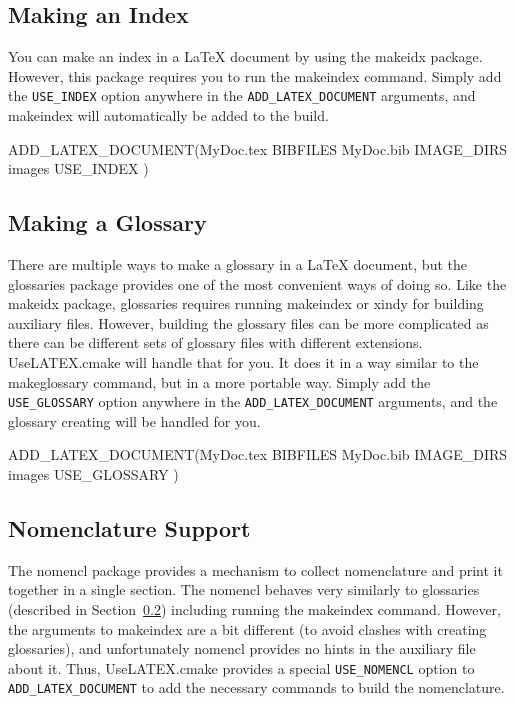 \documentclass{article}
\newcommand*{\textfile}[1]{\textsf{#1}}
\newcommand*{\textprog}[1]{\textfile{#1}}
\newcommand*{\textlatexpackage}[1]{\textsf{#1}}
\newcommand*{\textcmake}[1]{\texttt{#1}}
\newcommand*{\UseLATEX}{\textfile{UseLATEX.cmake}\xspace}
\newcommand*{\latex}{\LaTeX\xspace}
\newcommand*{\ald}{\textcmake{ADD\_LATEX\_DOCUMENT}\xspace}
\begin{document}
  \subsection{Making an Index}
  \label{sec:MakingAnIndex}

  You can make an index in a \latex document by using the
  \textlatexpackage{makeidx} package. However, this package requires you to
  run the \textprog{makeindex} command. Simply add the
  \textcmake{USE\_INDEX} option anywhere in the \ald arguments, and
  \textprog{makeindex} will automatically be added to the build.

  \begin{CodeListing}
ADD_LATEX_DOCUMENT(MyDoc.tex
  BIBFILES MyDoc.bib
  IMAGE_DIRS images
  USE_INDEX
  )
  \end{CodeListing}

  \subsection{Making a Glossary}
  \label{sec:MakingAGlossary}

  There are multiple ways to make a glossary in a \latex document, but the
  \textlatexpackage{glossaries} package provides one of the most convenient
  ways of doing so.  Like the \textlatexpackage{makeidx} package,
  \textlatexpackage{glossaries} requires running \textprog{makeindex} or
  \textprog{xindy} for building auxiliary files.  However, building the
  glossary files can be more complicated as there can be different sets of
  glossary files with different extensions.  \UseLATEX will handle that for
  you.  It does it in a way similar to the \textprog{makeglossary} command,
  but in a more portable way.  Simply add the \textcmake{USE\_GLOSSARY}
  option anywhere in the \ald arguments, and the glossary creating will be
  handled for you.

  \begin{CodeListing}
ADD_LATEX_DOCUMENT(MyDoc.tex
  BIBFILES MyDoc.bib
  IMAGE_DIRS images
  USE_GLOSSARY
  )
  \end{CodeListing}

  \subsection{Nomenclature Support}
  \label{sec:NomenclatureSupport}

  The \textlatexpackage{nomencl} package provides a mechanism to collect
  nomenclature and print it together in a single section.  The
  \textlatexpackage{nomencl} behaves very similarly to
  \textlatexpackage{glossaries} (described in
  Section~\ref{sec:MakingAGlossary}) including running the
  \textprog{makeindex} command.  However, the arguments to
  \textprog{makeindex} are a bit different (to avoid clashes with creating
  glossaries), and unfortunately \textlatexpackage{nomencl} provides no
  hints in the auxiliary file about it.  Thus, \UseLATEX provides a special
  \textcmake{USE\_NOMENCL} option to \ald to add the necessary commands to
  build the nomenclature.
\end{document}

